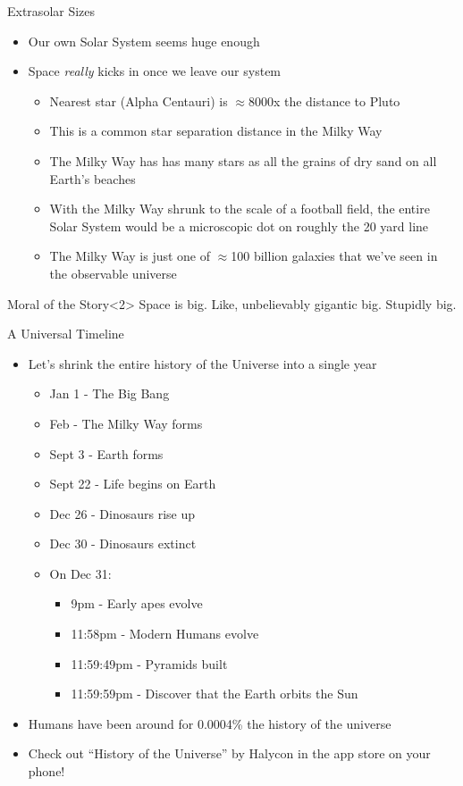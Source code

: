 \documentclass[pdf,aspectratio=169]{beamer}
\begin{document}
\begin{frame}{Extrasolar Sizes}
  \begin{itemize}
	\item Our own Solar System seems huge enough
	\item Space \emph{really} kicks in once we leave our system
	  \begin{itemize}
		\item Nearest star (Alpha Centauri) is $\approx$8000x the distance to Pluto
		\item This is a common star separation distance in the Milky Way
		\item The Milky Way has has many stars as all the grains of dry sand on all Earth's beaches
		\item With the Milky Way shrunk to the scale of a football field, the entire Solar System would be a microscopic dot on roughly the 20 yard line
		\item The Milky Way is just one of $\approx$100 billion galaxies that we've seen in the observable universe
	  \end{itemize}
  \end{itemize}
  \begin{alertblock}{Moral of the Story}<2>
	Space is big. Like, unbelievably gigantic big. Stupidly big.
  \end{alertblock}
\end{frame}

\begin{frame}{A Universal Timeline}
	\begin{itemize}[<+->]
	\item Let's shrink the entire history of the Universe into a single year
	  \begin{itemize}
		\item Jan 1 - The Big Bang
		\item Feb - The Milky Way forms
		\item Sept 3 - Earth forms
		\item Sept 22 - Life begins on Earth
		\item Dec 26 - Dinosaurs rise up
		\item Dec 30 - Dinosaurs extinct
		\item On Dec 31:
		  \begin{itemize}
			\item 9pm - Early apes evolve
			\item 11:58pm - Modern Humans evolve
			\item 11:59:49pm - Pyramids built
			\item 11:59:59pm - Discover that the Earth orbits the Sun
		  \end{itemize}
	  \end{itemize}
	\item Humans have been around for 0.0004\% the history of the universe
	\item Check out ``History of the Universe'' by Halycon in the app store on your phone!
  \end{itemize}
\end{frame}
\end{document}

